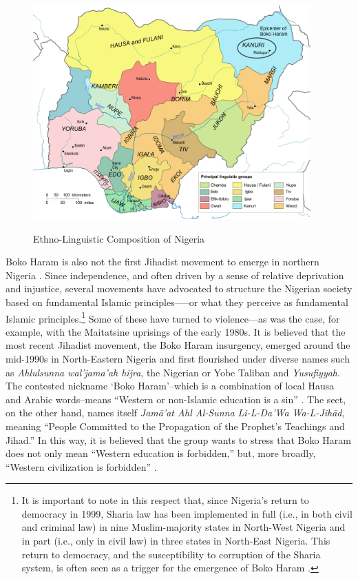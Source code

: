\begin{figure}[H]
{\includegraphics[width=0.95\textwidth]{Appendices/Appendix_chapter_1/intro-app2-fig1.png}}
\caption[Ethno-Linguistic Composition of Nigeria]{Ethno-Linguistic Composition of Nigeria}
\label{fig:intro-app2-fig1}
\end{figure}


Boko Haram is also not the first Jihadist movement to emerge in northern Nigeria \citep{Kendhammer2016}. Since independence, and often driven by a sense of relative deprivation and injustice, several movements have advocated to structure the Nigerian society based on fundamental Islamic principles—--or what they perceive as fundamental Islamic principles.\footnote{It is important to note in this respect that, since Nigeria’s return to democracy in 1999, Sharia law has been implemented in full (i.e., in both civil and criminal law) in nine Muslim-majority states in North-West Nigeria and in part (i.e., only in civil law) in three states in North-East Nigeria. This return to democracy, and the susceptibility to corruption of the Sharia system, is often seen as a trigger for the emergence of Boko Haram \citep{David2015e}.} Some of these have turned to violence—as was the case, for example, with the Maitatsine uprisings of the early 1980s. It is believed that the most recent Jihadist movement, the Boko Haram insurgency, emerged around the mid-1990s in North-Eastern Nigeria and first flourished under diverse names such as \textit{Ahlulsunna wal’jama’ah hijra}, the Nigerian or Yobe Taliban and \textit{Yusufiyyah}. The contested nickname `Boko Haram'--which is a combination of local Hausa and Arabic words--means ``Western or non-Islamic education is a sin'' \citep{Khan2015, Onuoha2010, Onuoha2012, PerousedeMontclos2015}. The sect, on the other hand, names itself \textit{Jamā'at Ahl Al-Sunna Li-L-Da'Wa Wa-L-Jihād}, meaning ``People Committed to the Propagation of the Prophet’s Teachings and Jihad.'' In this way, it is believed that the group wants to stress that Boko Haram does not only mean ``Western education is forbidden,'' but, more broadly, ``Western civilization is forbidden'' \citep{David2015e, Onuoha2012}. 

